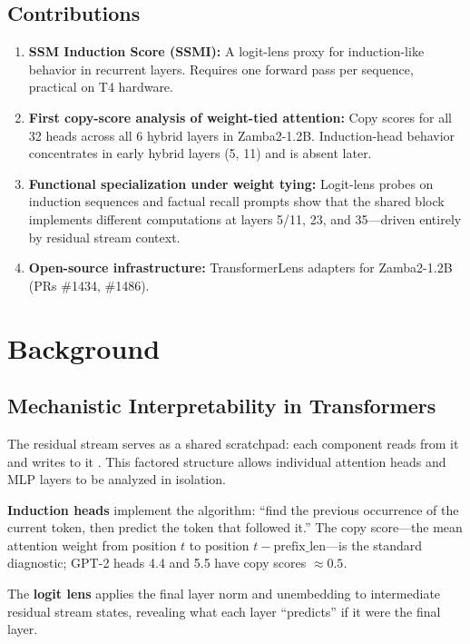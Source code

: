 \documentclass[11pt,a4paper]{article}
\begin{document}
\subsection{Contributions}

\begin{enumerate}[leftmargin=1.5em]
  \item \textbf{SSM Induction Score (SSMI):} A logit-lens proxy for induction-like behavior in recurrent layers. Requires one forward pass per sequence, practical on T4 hardware.
  \item \textbf{First copy-score analysis of weight-tied attention:} Copy scores for all 32 heads across all 6 hybrid layers in Zamba2-1.2B. Induction-head behavior concentrates in early hybrid layers (5, 11) and is absent later.
  \item \textbf{Functional specialization under weight tying:} Logit-lens probes on induction sequences and factual recall prompts show that the shared block implements different computations at layers 5/11, 23, and 35---driven entirely by residual stream context.
  \item \textbf{Open-source infrastructure:} TransformerLens adapters for Zamba2-1.2B (PRs \#1434, \#1486).
\end{enumerate}

\section{Background}

\subsection{Mechanistic Interpretability in Transformers}

The residual stream serves as a shared scratchpad: each component reads from it and writes to it \citep{elhage2021mathematical}. This factored structure allows individual attention heads and MLP layers to be analyzed in isolation.

\textbf{Induction heads} \citep{olsson2022context} implement the algorithm: ``find the previous occurrence of the current token, then predict the token that followed it.'' The copy score---the mean attention weight from position $t$ to position $t - \text{prefix\_len}$---is the standard diagnostic; GPT-2 heads 4.4 and 5.5 have copy scores ${\approx}0.5$.

The \textbf{logit lens} \citep{nostalgebraist2020logitlens} applies the final layer norm and unembedding to intermediate residual stream states, revealing what each layer ``predicts'' if it were the final layer.
\end{document}
